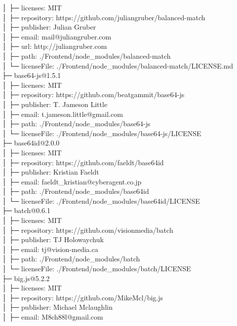 │  ├─ licenses: MIT\\
│  ├─ repository: https://github.com/juliangruber/balanced-match\\
│  ├─ publisher: Julian Gruber\\
│  ├─ email: mail@juliangruber.com\\
│  ├─ url: http://juliangruber.com\\
│  ├─ path: ./Frontend/node\_modules/balanced-match\\
│  └─ licenseFile: ./Frontend/node\_modules/balanced-match/LICENSE.md\\
├─ base64-js@1.5.1\\
│  ├─ licenses: MIT\\
│  ├─ repository: https://github.com/beatgammit/base64-js\\
│  ├─ publisher: T. Jameson Little\\
│  ├─ email: t.jameson.little@gmail.com\\
│  ├─ path: ./Frontend/node\_modules/base64-js\\
│  └─ licenseFile: ./Frontend/node\_modules/base64-js/LICENSE\\
├─ base64id@2.0.0\\
│  ├─ licenses: MIT\\
│  ├─ repository: https://github.com/faeldt/base64id\\
│  ├─ publisher: Kristian Faeldt\\
│  ├─ email: faeldt\_kristian@cyberagent.co.jp\\
│  ├─ path: ./Frontend/node\_modules/base64id\\
│  └─ licenseFile: ./Frontend/node\_modules/base64id/LICENSE\\
├─ batch@0.6.1\\
│  ├─ licenses: MIT\\
│  ├─ repository: https://github.com/visionmedia/batch\\
│  ├─ publisher: TJ Holowaychuk\\
│  ├─ email: tj@vision-media.ca\\
│  ├─ path: ./Frontend/node\_modules/batch\\
│  └─ licenseFile: ./Frontend/node\_modules/batch/LICENSE\\
├─ big.js@5.2.2\\
│  ├─ licenses: MIT\\
│  ├─ repository: https://github.com/MikeMcl/big.js\\
│  ├─ publisher: Michael Mclaughlin\\
│  ├─ email: M8ch88l@gmail.com\\
